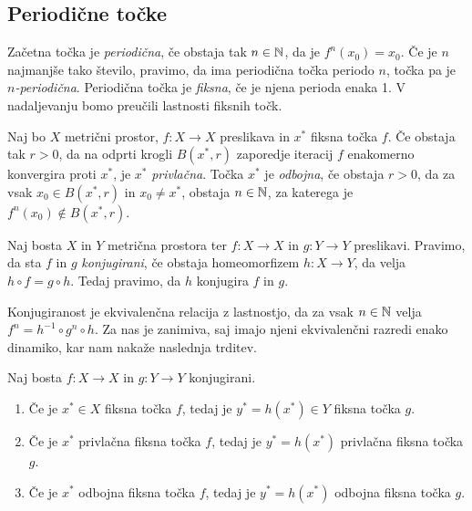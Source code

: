 \subsection{Periodične točke} \label{ssec:periodic}

Začetna točka je \emph{periodična}, če obstaja tak \(n \in \mathbb N\), da je \(f^n (x_0) = x_0\). Če je \(n\) najmanjše tako število, pravimo, da ima periodična točka periodo \(n\), točka pa je \emph{\(n\)-periodična}. Periodična točka je \emph{fiksna}, če je njena perioda enaka \num{1}. V nadaljevanju bomo preučili lastnosti fiksnih točk.

\begin{definicija}
    Naj bo \(X\) metrični prostor, \(f \colon X \to X\) preslikava in \(x^*\) fiksna točka \(f\). Če obstaja tak \(r > 0\), da na odprti krogli \(B (x^*, r)\) zaporedje iteracij \(f\) enakomerno konvergira proti \(x^*\), je \(x^*\) \emph{privlačna}. Točka \(x^*\) je \emph{odbojna}, če obstaja \(r > 0\), da za vsak \(x_0 \in B (x^*, r)\) in \(x_0 \neq x^*\), obstaja \(n \in \mathbb N\), za katerega je \(f^n (x_0) \notin B (x^*, r)\).
\end{definicija}

\begin{definicija}
    Naj bosta \(X\) in \(Y\) metrična prostora ter \(f \colon X \to X\) in \(g \colon Y \to Y\) preslikavi. Pravimo, da sta \(f\) in \(g\) \emph{konjugirani}, če obstaja homeomorfizem \(h \colon X \to Y\), da velja \(h \circ f = g \circ h\). Tedaj pravimo, da \(h\) konjugira \(f\) in \(g\).
\end{definicija}

Konjugiranost je ekvivalenčna relacija z lastnostjo, da za vsak \(n \in \mathbb N\) velja \(f^n = h^{-1} \circ g^n \circ h\). Za nas je zanimiva, saj imajo njeni ekvivalenčni razredi enako dinamiko, kar nam nakaže naslednja trditev.

\begin{trditev}
    Naj bosta \(f \colon X \to X\) in \(g \colon Y \to Y\) konjugirani.
    \begin{enumerate}
        \item Če je \(x^* \in X\) fiksna točka \(f\), tedaj je \(y^* = h (x^*) \in Y\) fiksna točka \(g\).
        \item Če je \(x^*\) privlačna fiksna točka \(f\), tedaj je \(y^* = h (x^*)\) privlačna fiksna točka \(g\).
        \item Če je \(x^*\) odbojna fiksna točka \(f\), tedaj je \(y^* = h (x^*)\) odbojna fiksna točka \(g\).
    \end{enumerate}
\end{trditev}

